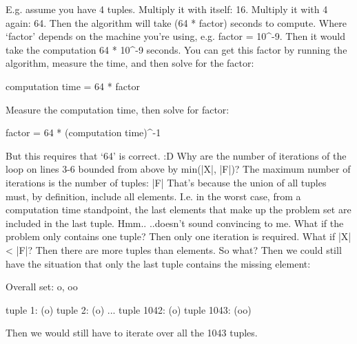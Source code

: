 E.g. assume you have 4 tuples.
Multiply it with itself: 16.
Multiply it with 4 again: 64.
Then the algorithm will take (64 * factor) seconds to compute.
Where `factor' depends on the machine you're using, e.g. factor = 10^-9.
Then it would take the computation 64 * 10^-9 seconds.
You can get this factor by running the algorithm, measure the time, and then solve for the factor:

computation time = 64 * factor

Measure the computation time, then solve for factor:

factor = 64 * (computation time)^-1

But this requires that `64' is correct. :D
Why are the number of iterations of the loop on lines 3-6 bounded from above by min(|X|, |F|)?
The maximum number of iterations is the number of tuples: |F|
That's because the union of all tuples must, by definition, include all elements.
I.e. in the worst case, from a computation time standpoint, the last elements that make up the problem set are included in the last tuple.
Hmm..
..doesn't sound convincing to me.
What if the problem only contains one tuple?
Then only one iteration is required.
What if |X| < |F|?
Then there are more tuples than elements.
So what?
Then we could still have the situation that only the last tuple contains the missing element:

Overall set: {o, oo}

tuple 1: (o)
tuple 2: (o)
...
tuple 1042: (o)
tuple 1043: (oo)

Then we would still have to iterate over all the 1043 tuples.
 